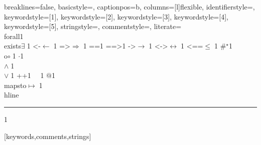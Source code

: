 {    %
    breaklines=false,
    basicstyle=\small,
    captionpos=b,
    columns=[l]flexible,
    identifierstyle={\ttfamily\color{black}},
    keywordstyle=[1]{\ttfamily\color{dkviolet}},
    keywordstyle=[2]{\ttfamily\color{dkgreen}},
    keywordstyle=[3]{\ttfamily\color{ltblue}},
    keywordstyle=[4]{\ttfamily\color{dkblue}},
    keywordstyle=[5]{\ttfamily\color{dkred}},
    stringstyle=\ttfamily,
    commentstyle={\ttfamily\color{dkgreen}},
    literate=
    {\\forall}{{\color{dkgreen}{$\forall\;$}}}1
    {\\exists}{{$\exists\;$}}1
    {<-}{{$\leftarrow\;$}}1
    {=>}{{$\Rightarrow\;$}}1
    {==}{{\code{==}\;}}1
    {==>}{{\code{==>}\;}}1
    {->}{{$\rightarrow\;$}}1
    {<->}{{$\leftrightarrow\;$}}1
    {<==}{{$\leq\;$}}1
    {\#}{{$^\star$}}1 
    {\\o}{{$\circ\;$}}1 
    {\@}{{$\cdot$}}1 
    {\/\\}{{$\wedge\;$}}1
    {\\\/}{{$\vee\;$}}1
    {++}{{\code{++}}}1
    {~}{{\ }}1
    {\@\@}{{$@$}}1
    {\\mapsto}{{$\mapsto\;$}}1
    {\\hline}{{\rule{\linewidth}{0.5pt}}}1
}[keywords,comments,strings]
